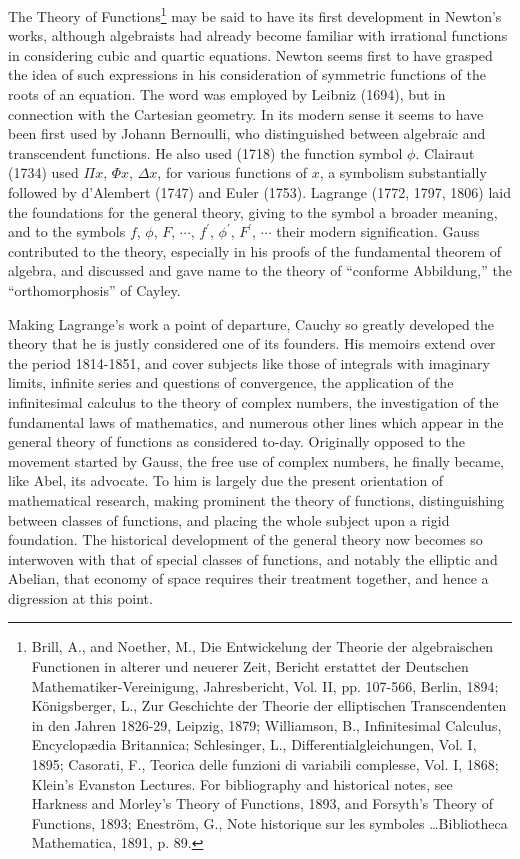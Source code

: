 \documentclass[oneside]{book}
\begin{document}
The Theory of Functions\footnote{Brill, A., and Noether, M., Die
Entwickelung der Theorie der algebraischen Functionen in alterer
und neuerer Zeit, Bericht erstattet der Deutschen
Mathematiker-Vereinigung, Jahresbericht, Vol. II, pp. 107-566,
Berlin, 1894; K\"onigsberger, L., Zur Geschichte der Theorie der
elliptischen Transcendenten in den Jahren 1826-29, Leipzig, 1879;
Williamson, B., Infinitesimal Calculus, Encyclop\ae{}dia Britannica;
Schlesinger, L., Differentialgleichungen, Vol. I, 1895; Casorati,
F., Teorica delle funzioni di variabili complesse, Vol. I, 1868;
Klein's Evanston Lectures. For bibliography and historical notes,
see Harkness and Morley's Theory of Functions, 1893, and Forsyth's
Theory of Functions, 1893; Enestr\"om, G., Note historique sur les
symboles \ldots Bibliotheca Mathematica, 1891, p. 89.} may be said to
have its first development in Newton's works, although algebraists
had already become familiar with irrational functions in considering
cubic and quartic equations. Newton seems first to have grasped the
idea of such expressions in his consideration of symmetric functions
of the roots of an equation. The word was employed by Leibniz
(1694), but in connection with the Cartesian geometry. In its modern
sense it seems to have been first used by Johann Bernoulli, who
distinguished between algebraic and transcendent functions. He also
used (1718) the function symbol $\phi$. Clairaut (1734) used $\Pi
x$, $\Phi x$, $\Delta x$, for various functions of $x$, a symbolism
substantially followed by d'Alembert (1747) and Euler
(1753). Lagrange (1772, 1797, 1806) laid the foundations for the
general theory, giving to the symbol a broader meaning, and to the
symbols $f$, $\phi$, $F$, $\cdots$, $f^{\prime}$, $\phi^{\prime}$,
$F^{\prime}$, $\cdots$ their modern signification. Gauss contributed
to the theory, especially in his proofs of the fundamental theorem
of algebra, and discussed and gave name to the theory of ``conforme
Abbildung,'' the ``orthomorphosis'' of Cayley.

Making Lagrange's work a point of departure, Cauchy so greatly
developed the theory that he is justly considered one of its
founders. His memoirs extend over the period 1814-1851, and cover
subjects like those of integrals with imaginary limits, infinite
series and questions of convergence, the application of the
infinitesimal calculus to the theory of complex numbers, the
investigation of the fundamental laws of mathematics, and numerous
other lines which appear in the general theory of functions as
considered to-day. Originally opposed to the movement started by
Gauss, the free use of complex numbers, he finally became, like
Abel, its advocate. To him is largely due the present orientation of
mathematical research, making prominent the theory of functions,
distinguishing between classes of functions, and placing the whole
subject upon a rigid foundation. The historical development of the
general theory now becomes so interwoven with that of special
classes of functions, and notably the elliptic and Abelian, that
economy of space requires their treatment together, and hence a
digression at this point.
\end{document}

